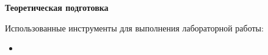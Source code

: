 \textbf{Теоретическая подготовка}
\vspace{0.5cm}

Использованные инструменты для выполнения лабораторной работы:
\begin{itemize}
    \item 
\end{itemize}